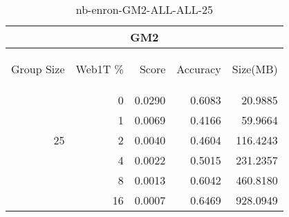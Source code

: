 \begin{center}
\begin{table}[htbp] 
 \begin{center}
\begin{tabular}{ | r | r | r | r | r |}
\hline
\multicolumn{5}{|c|}{GM2}\\
\hline
\begin{sideways}Group Size\end{sideways} & \begin{sideways}Web1T \%\end{sideways} & \begin{sideways}Score\end{sideways} & \begin{sideways}Accuracy\end{sideways} & \begin{sideways}Size(MB)\end{sideways}\\
\hline
\multirow{5}{*}{25}
 & 0 & 0.0290 & 0.6083 & 20.9885\\ \cline{2-5}
 & 1 & 0.0069 & 0.4166 & 59.9664\\ \cline{2-5}
 & 2 & 0.0040 & 0.4604 & 116.4243\\ \cline{2-5}
 & 4 & 0.0022 & 0.5015 & 231.2357\\ \cline{2-5}
 & 8 & 0.0013 & 0.6042 & 460.8180\\ \cline{2-5}
 & 16 & 0.0007 & 0.6469 & 928.0949\\ \cline{2-5}
\hline
\end{tabular}
\caption{nb-enron-GM2-ALL-ALL-25}
\label{table:nb-enron-GM2-ALL-ALL-25}
\end{center}
 \end{table}
\end{center}

